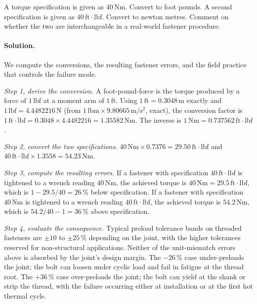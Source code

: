 \begin{exercise}
A torque specification is given as $40\,\si{\newton\meter}$. Convert
to foot pounds. A second specification is given as
$40\,\text{ft}\cdot\text{lbf}$. Convert to newton metres. Comment on whether
the two are interchangeable in a real-world fastener procedure.

\paragraph{Solution.}
We compute the conversions, the resulting fastener errors, and the
field practice that controls the failure mode.

\textit{Step 1, derive the conversion.} A foot-pound-force is the
torque produced by a force of $1\,\text{lbf}$ at a moment arm of
$1\,\text{ft}$. Using $1\,\text{ft} = 0.3048\,\si{\meter}$ exactly and
$1\,\text{lbf} = 4.4482216\,\si{\newton}$ (from $1\,\text{lbm} \times
9.80665\,\si{\meter\per\second\squared}$, exact), the conversion
factor is
$1\,\text{ft}\cdot\text{lbf} = 0.3048 \times 4.4482216 = 1.35582
\,\si{\newton\meter}$.
The inverse is $1\,\si{\newton\meter} = 0.737562 \,\text{ft}\cdot
\text{lbf}$.

\textit{Step 2, convert the two specifications.}
$40\,\si{\newton\meter} \times 0.7376 = 29.50 \,\text{ft}\cdot\text{
lbf}$ and $40\,\text{ft}\cdot\text{lbf} \times 1.3558 = 54.23
\,\si{\newton\meter}$.

\textit{Step 3, compute the resulting errors.} If a fastener with
specification $40\,\text{ft}\cdot\text{lbf}$ is tightened to a wrench
reading $40\,\si{\newton\meter}$, the achieved torque is
$40\,\si{\newton\meter} = 29.5\,\text{ft}\cdot\text{lbf}$, which is
$1 - 29.5/40 = 26\,\%$ below specification. If a fastener with
specification $40\,\si{\newton\meter}$ is tightened to a wrench
reading $40\,\text{ft}\cdot\text{lbf}$, the achieved torque is
$54.2\,\si{\newton\meter}$, which is $54.2/40 - 1 = 36\,\%$ above
specification.

\textit{Step 4, evaluate the consequence.} Typical preload tolerance
bands on threaded fasteners are $\pm 10$ to $\pm 25\,\%$ depending on
the joint, with the higher tolerances reserved for non-structural
applications. Neither of the unit-mismatch errors above is absorbed by
the joint's design margin. The $-26\,\%$ case under-preloads the
joint; the bolt can loosen under cyclic load and fail in fatigue at
the thread root. The $+36\,\%$ case over-preloads the joint; the bolt
can yield at the shank or strip the thread, with the failure occurring
either at installation or at the first hot thermal cycle.


\end{exercise}
